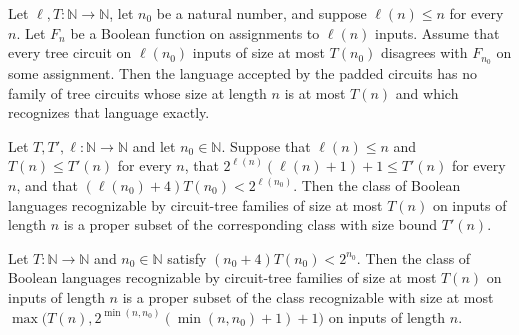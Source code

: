 \begin{theorem}
\label{BoolCircuit.padLanguage_not_inTreeSize}
\leanok
{}
Let $\ell,T:\mathbb{N}\to\mathbb{N}$, let $n_0$ be a natural number, and suppose
$\ell(n)\le n$ for every $n$. Let $F_n$ be a Boolean function on assignments to
$\ell(n)$ inputs. Assume that every tree circuit on $\ell(n_0)$ inputs of size at most
$T(n_0)$ disagrees with $F_{n_0}$ on some assignment. Then the language accepted by the
padded circuits has no family of tree circuits whose size at length $n$ is at most
$T(n)$ and which recognizes that language exactly.
\end{theorem}

\begin{theorem}
\label{BoolCircuit.treeSize_ssubset}
\leanok
{}
Let $T,T',\ell:\mathbb N\to\mathbb N$ and let $n_0\in\mathbb N$. Suppose that
$\ell(n)\le n$ and $T(n)\le T'(n)$ for every $n$, that $2^{\ell(n)}(\ell(n)+1)+1\le
T'(n)$ for every $n$, and that $(\ell(n_0)+4)T(n_0)<2^{\ell(n_0)}$. Then the class of
Boolean languages recognizable by circuit-tree families of size at most $T(n)$ on inputs
of length $n$ is a proper subset of the corresponding class with size bound $T'(n)$.
\end{theorem}

\begin{theorem}
\label{BoolCircuit.treeSize_ssubset_of_lt}
\leanok
{}
Let $T:\mathbb N\to\mathbb N$ and $n_0\in\mathbb N$ satisfy $(n_0+4)T(n_0)<2^{n_0}$.
Then the class of Boolean languages recognizable by circuit-tree families of size at
most $T(n)$ on inputs of length $n$ is a proper subset of the class recognizable with
size at most $\max\bigl(T(n),2^{\min(n,n_0)}(\min(n,n_0)+1)+1\bigr)$ on inputs of length
$n$.
\end{theorem}

